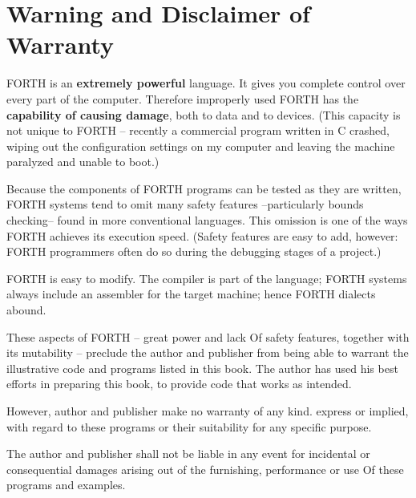
\chapter{Warning and Disclaimer of Warranty}
FORTH is an \textbf{extremely powerful} language. It gives you complete control over every part of the computer. Therefore improperly used FORTH has the \textbf{capability of causing damage}, both to data and to devices. (This capacity is not unique to FORTH -- recently a commercial program written in C crashed, wiping out the configuration settings on my computer and leaving the machine paralyzed and unable to boot.) 

Because the components of FORTH programs can be tested as they are written, FORTH systems tend to omit many safety features --particularly bounds checking-- found in more conventional languages. This omission is one of the ways FORTH achieves its execution speed. (Safety features are easy to add, however: FORTH programmers often do so during the debugging stages of a project.)

FORTH is easy to modify. The compiler is part of the language; FORTH systems always include an assembler for the target machine; hence FORTH dialects abound.

These aspects of FORTH -- great power and lack Of safety features, together with its mutability -- preclude the author and publisher from being able to warrant the illustrative code and programs listed in this book. The author has used his best efforts in preparing this book, to provide code that works as intended.

\leftbar[1\linewidth]
However, author and publisher make no warranty of any kind. express or implied, with regard to these programs or their suitability for any specific purpose.
\endleftbar

\leftbar[1\linewidth]
The author and publisher shall not be liable in any event for incidental or consequential damages arising out of the furnishing, performance or use Of these programs and examples.
\endleftbar